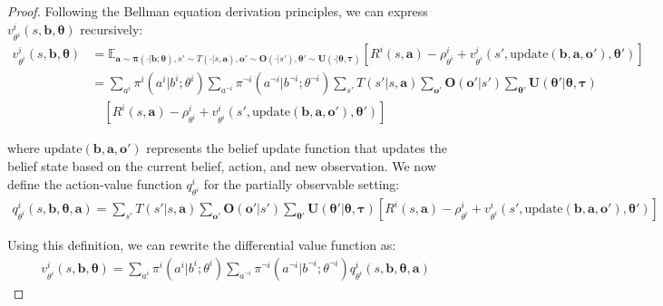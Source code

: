 \documentclass[a4paper,12pt]{report}
\begin{document}
\begin{proof}
    Following the Bellman equation derivation principles, we can express
    $v^{i}_{\theta^i}(s, \boldsymbol{b}, \boldsymbol{\theta})$ recursively:
    \begin{align}
        v^{i}_{\theta^i}(s, \boldsymbol{b}, \boldsymbol{\theta}) & = \mathbb{E}_{\boldsymbol{a} \sim \boldsymbol{\pi}(\cdot|\boldsymbol{b};\boldsymbol{\theta}), s' \sim T(\cdot|s,\boldsymbol{a}), \boldsymbol{o}' \sim \boldsymbol{O}(\cdot|s'), \boldsymbol{\theta}' \sim \boldsymbol{U}(\cdot|\boldsymbol{\theta}, \boldsymbol{\tau})}\left[ R^{i}(s, \boldsymbol{a}) - \rho^{i}_{\theta^i}+ v^{i}_{\theta^i}(s', \text{update}(\boldsymbol{b}, \boldsymbol{a}, \boldsymbol{o}'), \boldsymbol{\theta}') \right] \\
                                                                 & = \sum_{a^i}\pi^{i}(a^{i}|b^{i}; \theta^{i}) \sum_{a^{\neg i}}\pi^{\neg i}(a^{\neg i}|b^{\neg i}; \theta^{\neg i}) \sum_{s'}T(s'|s, \boldsymbol{a}) \sum_{\boldsymbol{o}'}\boldsymbol{O}(\boldsymbol{o}'|s') \sum_{\boldsymbol{\theta}'}\boldsymbol{U}(\boldsymbol{\theta}'|\boldsymbol{\theta}, \boldsymbol{\tau})                                                                                                                              \\
                                                                 & \quad \left[ R^{i}(s, \boldsymbol{a}) - \rho^{i}_{\theta^i}+ v^{i}_{\theta^i}(s', \text{update}(\boldsymbol{b}, \boldsymbol{a}, \boldsymbol{o}'), \boldsymbol{\theta}') \right]
    \end{align}

    where $\text{update}(\boldsymbol{b}, \boldsymbol{a}, \boldsymbol{o}')$
    represents the belief update function that updates the belief state based on
    the current belief, action, and new observation. We now define the action-value
    function $q^{i}_{\theta^i}$ for the partially observable setting:
    \begin{align}
        q^{i}_{\theta^i}(s, \boldsymbol{b}, \boldsymbol{\theta}, \boldsymbol{a}) = \sum_{s'}T(s'|s, \boldsymbol{a}) \sum_{\boldsymbol{o}'}\boldsymbol{O}(\boldsymbol{o}'|s') \sum_{\boldsymbol{\theta}'}\boldsymbol{U}(\boldsymbol{\theta}'|\boldsymbol{\theta}, \boldsymbol{\tau}) \left[ R^{i}(s, \boldsymbol{a}) - \rho^{i}_{\theta^i}+ v^{i}_{\theta^i}(s', \text{update}(\boldsymbol{b}, \boldsymbol{a}, \boldsymbol{o}'), \boldsymbol{\theta}') \right]
    \end{align}

    Using this definition, we can rewrite the differential value function as:
    \begin{align}
        v^{i}_{\theta^i}(s, \boldsymbol{b}, \boldsymbol{\theta}) = \sum_{a^i}\pi^{i}(a^{i}|b^{i}; \theta^{i}) \sum_{a^{\neg i}}\pi^{\neg i}(a^{\neg i}|b^{\neg i}; \theta^{\neg i}) q^{i}_{\theta^i}(s, \boldsymbol{b}, \boldsymbol{\theta}, \boldsymbol{a})
    \end{align}


\end{proof}
\end{document}
